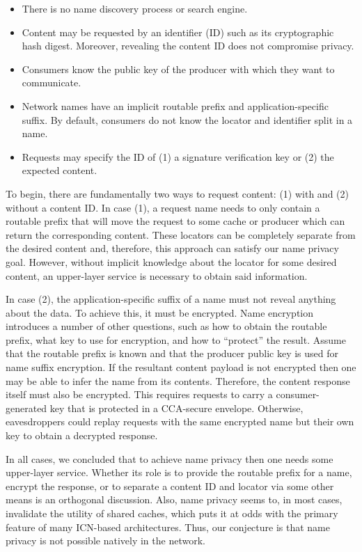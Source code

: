 \documentclass[a4paper,UKenglish]{dagrep}
\begin{document}
\begin{itemize}
\item There is no name discovery process or search engine.
\item Content may be requested by an identifier (ID) such as its cryptographic hash digest. Moreover, revealing the content ID does not compromise privacy.
\item Consumers know the public key of the producer with which they want to communicate.
\item Network names have an implicit routable prefix and application-specific suffix. By default, consumers do not know the locator and identifier split in a name.
\item Requests may specify the ID of (1) a signature verification key or (2) the expected content.
\end{itemize}

To begin, there are fundamentally two ways to request content: (1) with and (2) without a content ID. In case (1), a request name needs to only contain a routable prefix that will move the request to some cache or producer which can return the corresponding content. These locators can be completely separate from the desired content and, therefore, this approach can satisfy our name privacy goal. However, without implicit knowledge about the locator for some desired content, an upper-layer service is necessary to obtain said information.

In case (2), the application-specific suffix of a name must not reveal anything about the data. To achieve this, it must be encrypted. Name encryption introduces a number of other questions, such as how to obtain the routable prefix, what key to use for encryption, and how to ``protect'' the result. Assume that the routable prefix is known and that the producer public key is used for name suffix encryption. If the resultant content payload is not encrypted then one may be able to infer the name from its contents. Therefore, the content response itself must also be encrypted. This requires requests to carry a consumer-generated key that is protected in a CCA-secure envelope. Otherwise, eavesdroppers could replay requests with the same encrypted name but their own key to obtain a decrypted response.

In all cases, we concluded that to achieve name privacy then one needs some upper-layer service. Whether its role is to provide the routable prefix for a name, encrypt the response, or to separate a content ID and locator via some other means is an orthogonal discussion. Also, name privacy seems to, in most cases, invalidate the utility of shared caches, which puts it at odds with the primary feature of many ICN-based architectures. Thus, our conjecture is that name privacy is not possible natively in the network.
\end{document}
